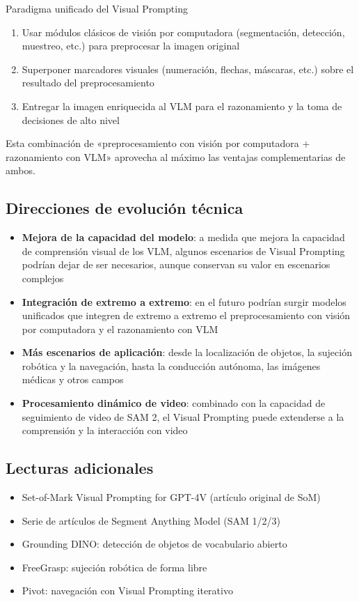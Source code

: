 \documentclass[a4paper]{article}
\begin{document}
\begin{importantbox}{Paradigma unificado del Visual Prompting}
\begin{enumerate}
    \item Usar módulos clásicos de visión por computadora (segmentación, detección, muestreo, etc.) para preprocesar la imagen original
    \item Superponer marcadores visuales (numeración, flechas, máscaras, etc.) sobre el resultado del preprocesamiento
    \item Entregar la imagen enriquecida al VLM para el razonamiento y la toma de decisiones de alto nivel
\end{enumerate}
Esta combinación de «preprocesamiento con visión por computadora + razonamiento con VLM» aprovecha al máximo las ventajas complementarias de ambos.
\end{importantbox}

\subsection{Direcciones de evolución técnica}

\begin{itemize}
    \item \textbf{Mejora de la capacidad del modelo}: a medida que mejora la capacidad de comprensión visual de los VLM, algunos escenarios de Visual Prompting podrían dejar de ser necesarios, aunque conservan su valor en escenarios complejos
    \item \textbf{Integración de extremo a extremo}: en el futuro podrían surgir modelos unificados que integren de extremo a extremo el preprocesamiento con visión por computadora y el razonamiento con VLM
    \item \textbf{Más escenarios de aplicación}: desde la localización de objetos, la sujeción robótica y la navegación, hasta la conducción autónoma, las imágenes médicas y otros campos
    \item \textbf{Procesamiento dinámico de video}: combinado con la capacidad de seguimiento de video de SAM 2, el Visual Prompting puede extenderse a la comprensión y la interacción con video
\end{itemize}

\subsection{Lecturas adicionales}

\begin{itemize}
    \item Set-of-Mark Visual Prompting for GPT-4V (artículo original de SoM)
    \item Serie de artículos de Segment Anything Model (SAM 1/2/3)
    \item Grounding DINO: detección de objetos de vocabulario abierto
    \item FreeGrasp: sujeción robótica de forma libre
    \item Pivot: navegación con Visual Prompting iterativo
\end{itemize}

\end{document}
